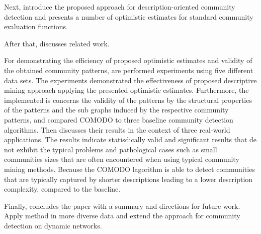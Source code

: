 \documentclass[a4paper]{article}
\begin{document}
Next, introduce the proposed approach for description-oriented community detection and presents a number of optimistic estimates for standard community evaluation functions. 
\vskip 0.3cm

After that, discusses related work. 
\vskip 0.3cm

For demonstrating the efficiency of proposed optimistic estimates and validity of the obtained community patterns, are performed experiments using five different data sets. The experiments demonstrated the effectiveness of proposed descriptive mining approach applying the presented optimistic estimates. Furthermore, the implemented is concerns the validity of the patterns by the structural properties of the patterns and the sub graphs induced by the respective community patterns, and compared COMODO to three baseline community detection algorithms.
 Then discusses their results in the context of three real-world applications. The results indicate statisdically valid and significant results that de not exhibit the typical problems and pathological cases such as small communities sizes that are often encountered when using typical community mining methods. Because the COMODO lagorithm is able to detect communities that are typically captured by shorter descriptions leading to a lower description complexity, compared to the baseline.
\vskip 0.3cm

Finally, concludes the paper with a summary and directions for future work. Apply method in more diverse data and extend the approach for community detection on dynamic networks.
\end{document}
